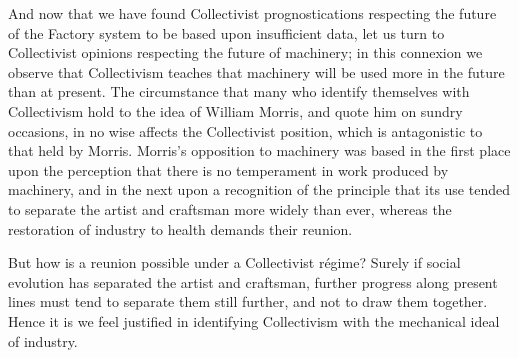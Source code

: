 \documentclass{book}
\begin{document}
And now that we have found Collectivist prognostications respecting the future of the Factory system to be based upon insufficient data, let us turn to Collectivist opinions respecting the future of machinery; in this connexion we observe that Collectivism teaches that machinery will be used more in the future than at present. The circumstance that many who identify themselves with Collectivism hold to the idea of William Morris, and quote him on sundry occasions, in no wise affects the Collectivist position, which is antagonistic to that held by Morris. Morris’s opposition to machinery was based in the first place upon the perception that there is no temperament in work produced by machinery, and in the next upon a recognition of the principle that its use tended to separate the artist and craftsman more widely than ever, whereas the restoration of industry to health demands their reunion.

But how is a reunion possible under a Collectivist régime? Surely if social evolution has separated the artist and craftsman, further progress along present lines must tend to separate them still further, and not to draw them together. Hence it is we feel justified in identifying Collectivism with the mechanical ideal of industry.
\end{document}
